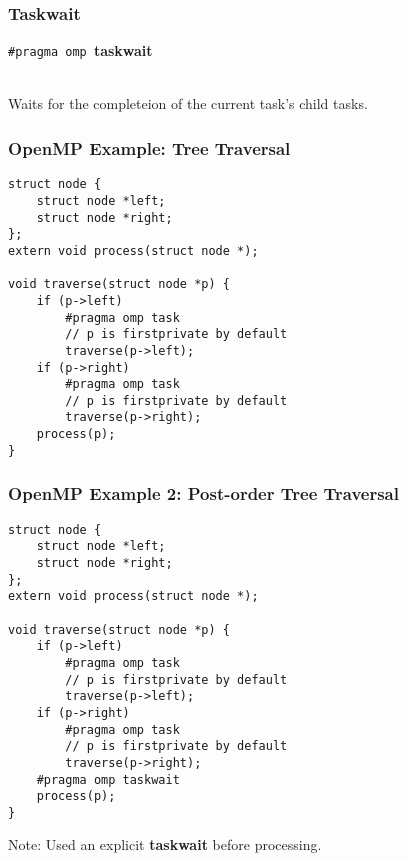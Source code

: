\documentclass[aspectratio=43]{beamer}
\newenvironment{changemargin}[1]{%
  \begin{list}{}{%
    \setlength{\topsep}{0pt}%
    \setlength{\leftmargin}{#1}%
    \setlength{\rightmargin}{1em}
    \setlength{\listparindent}{\parindent}%
    \setlength{\itemindent}{\parindent}%
    \setlength{\parsep}{\parskip}%
  }%
  \item[]}{\end{list}}
\begin{document}
\begin{frame}[fragile]
  \frametitle{Taskwait}

  \begin{changemargin}{1.5cm}

  \begin{center}
    {\tt \#pragma omp }{\bf taskwait}
  \end{center}~\\[1em]

     Waits for the completeion of the current task's child tasks.
  \end{changemargin}

\end{frame}

\begin{frame}[fragile]
  \frametitle{OpenMP Example: Tree Traversal}

  \begin{changemargin}{1.5cm}
  \begin{lstlisting}
struct node {
    struct node *left;
    struct node *right;
};
extern void process(struct node *);

void traverse(struct node *p) {
    if (p->left)
        #pragma omp task
        // p is firstprivate by default
        traverse(p->left);
    if (p->right)
        #pragma omp task
        // p is firstprivate by default
        traverse(p->right);
    process(p);
}    
  \end{lstlisting}
  \end{changemargin}
\end{frame}

\begin{frame}[fragile]
  \frametitle{OpenMP Example 2: Post-order Tree Traversal}

  \begin{changemargin}{1.5cm}
  \begin{lstlisting}
struct node {
    struct node *left;
    struct node *right;
};
extern void process(struct node *);

void traverse(struct node *p) {
    if (p->left)
        #pragma omp task
        // p is firstprivate by default
        traverse(p->left);
    if (p->right)
        #pragma omp task
        // p is firstprivate by default
        traverse(p->right);
    #pragma omp taskwait
    process(p);
}    
  \end{lstlisting}
  
  Note: Used an explicit {\bf taskwait} before processing.
  \end{changemargin}
\end{frame}
\end{document}
